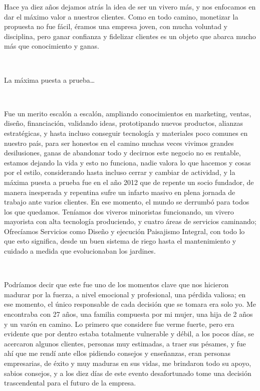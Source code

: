 Hace ya diez años dejamos atrás la idea de ser un vivero más, y nos
enfocamos en dar el máximo valor a nuestros clientes. Como en todo
camino, monetizar la propuesta no fue fácil, éramos una empresa joven,
con mucha voluntad y disciplina, pero ganar confianza y fidelizar
clientes es un objeto que abarca mucho más que conocimiento y ganas.

~

La máxima puesta a prueba\ldots{}

~

Fue un merito escalón a escalón, ampliando conocimientos en marketing,
ventas, diseño, financiación, validando ideas, prototipando nuevos
productos, alianzas estratégicas, y hasta incluso conseguir tecnología y
materiales poco comunes en nuestro país, para ser honestos en el camino
muchas veces vivimos grandes desilusiones, ganas de abandonar todo y
decirnos este negocio no es rentable, estamos dejando la vida y esto no
funciona, nadie valora lo que hacemos y cosas por el estilo,
considerando hasta incluso cerrar y cambiar de actividad, y la máxima
puesta a prueba fue en el año 2012 que de repente un socio fundador, de
manera inesperada y repentina sufre un infarto masivo en plena jornada
de trabajo ante varios clientes. En ese momento, el mundo se derrumbó
para todos los que quedamos. Teníamos dos viveros minoristas
funcionando, un vivero mayorista con alta tecnología produciendo, y
cuatro áreas de servicios caminando; Ofrecíamos Servicios como Diseño y
ejecución Paisajismo Integral, con todo lo que esto significa, desde un
buen sistema de riego hasta el mantenimiento y cuidado a medida que
evolucionaban los jardines.

~

Podríamos decir que este fue uno de los momentos clave que nos hicieron
madurar por la fuerza, a nivel emocional y profesional, una pérdida
valiosa; en ese momento, el único responsable de cada decisión que se
tomara era solo yo. Me encontraba con 27 años, una familia compuesta por
mi mujer, una hija de 2 años y un varón en camino. Lo primero que
considere fue verme fuerte, pero era evidente que por dentro estaba
totalmente vulnerable y débil, a los pocos días, se acercaron algunos
clientes, personas muy estimadas, a traer sus pésames, y fue ahí que me
rendí ante ellos pidiendo consejos y enseñanzas, eran personas
empresarias, de éxito y muy maduras en sus vidas, me brindaron todo su
apoyo, sabios consejos, y a los diez días de este evento desafortunado
tome una decisión trascendental para el futuro de la empresa.

